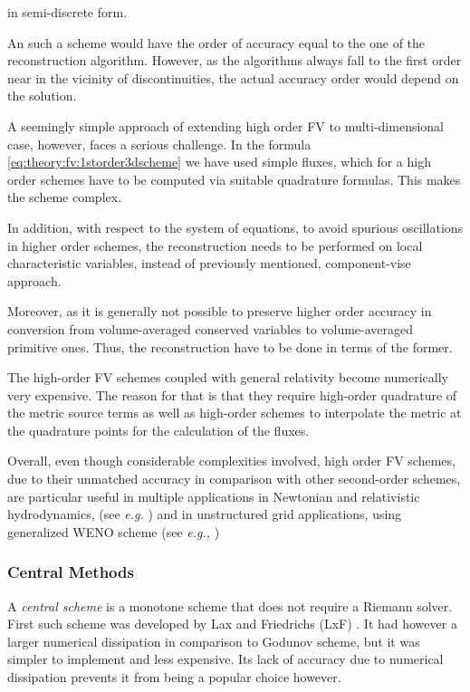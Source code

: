 in semi-discrete form. 

An such a scheme would have the order of accuracy equal to the one of the reconstruction algorithm. 
However, as the algorithms always fall to the first order near in the vicinity of discontinuities, the actual accuracy order would depend on the solution. 

A seemingly simple approach of extending high order FV to multi-dimensional case, however, faces a serious challenge. 
In the formula \ref{eq:theory:fv:1storder3dscheme} we have used simple fluxes, which for a high order schemes have to be computed via suitable quadrature formulas. 
This makes the scheme complex. 

In addition, with respect to the system of equations, to avoid spurious oscillations in higher order schemes, the reconstruction needs to be performed on local characteristic variables, instead of previously mentioned, component-vise approach. 

Moreover, as it is generally not possible to preserve higher order accuracy in conversion from volume-averaged conserved variables to volume-averaged primitive ones. 
Thus, the reconstruction have to be done in terms of the former. 

The high-order FV schemes coupled with general relativity become numerically very expensive. 
The reason for that is that they require high-order quadrature of the metric source terms as well as high-order
schemes to interpolate the metric at the quadrature points for the calculation of the fluxes. 

Overall, even though considerable complexities involved, high order FV schemes, due to their unmatched accuracy in comparison with other second-order schemes, are particular useful in multiple applications in Newtonian and relativistic hydrodynamics, (see \textit{e.g.} \cite{Tchekhovskoy:2007zn}) and in unstructured grid applications, using generalized WENO scheme (see \textit{e.g.,} \cite{Dumbser:2007})



\subsubsection{Central Methods}



A \textit{central scheme} is a monotone scheme that does not require a Riemann solver. 
First such scheme was developed by Lax and Friedrichs (LxF) \cite{Lax:1954,Friedrichs:1954}. It had however a larger numerical dissipation in comparison to Godunov scheme, but it was simpler to implement and less expensive. Its lack of accuracy due to numerical dissipation prevents it from being a popular choice however.

